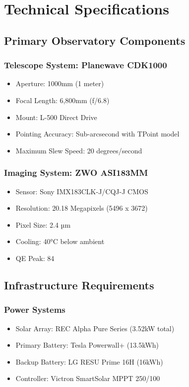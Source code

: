 \documentclass{article}
\begin{document}
\section{Technical Specifications}

\subsection{Primary Observatory Components}

\subsubsection{Telescope System: Planewave CDK1000}
\begin{itemize}
    \item Aperture: 1000mm (1 meter)
    \item Focal Length: 6,800mm (f/6.8)
    \item Mount: L-500 Direct Drive
    \item Pointing Accuracy: Sub-arcsecond with TPoint model
    \item Maximum Slew Speed: 20 degrees/second
\end{itemize}

\subsubsection{Imaging System: ZWO ASI183MM}
\begin{itemize}
    \item Sensor: Sony IMX183CLK-J/CQJ-J CMOS
    \item Resolution: 20.18 Megapixels (5496 x 3672)
    \item Pixel Size: 2.4 µm
    \item Cooling: 40°C below ambient
    \item QE Peak: 84%
\end{itemize}

\subsection{Infrastructure Requirements}

\subsubsection{Power Systems}
\begin{itemize}
    \item Solar Array: REC Alpha Pure Series (3.52kW total)
    \item Primary Battery: Tesla Powerwall+ (13.5kWh)
    \item Backup Battery: LG RESU Prime 16H (16kWh)
    \item Controller: Victron SmartSolar MPPT 250/100
\end{itemize}
\end{document}
